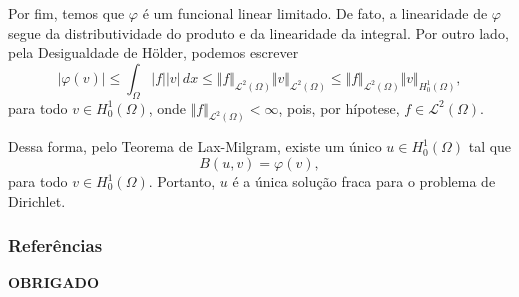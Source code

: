 \documentclass[xcolor=dvipsnames, aspectratio=169, 10pt]{beamer}
\newcommand{\cL}{\mathcal{L}}
\begin{document}
\begin{frame}
    Por fim, temos que $\varphi$ é um funcional linear limitado.
De fato, a linearidade de $\varphi$ segue da distributividade do produto e da linearidade da integral.
Por outro lado, pela Desigualdade de Hölder, podemos escrever
\[
    |\varphi(v)| \leqslant \int_\Omega |f| |v| \,dx \leqslant \Vert f \Vert_{\cL^2(\Omega)} \Vert v \Vert_{\cL^2(\Omega)} \leqslant \Vert f \Vert_{\cL^2(\Omega)} \Vert v \Vert_{H^1_0(\Omega)},
\]
para todo $v \in H^1_0(\Omega)$, onde $\Vert f \Vert_{\cL^2(\Omega)} < \infty$, pois, por hípotese, $f \in \cL^2(\Omega)$.
\end{frame}
\begin{frame}
    Dessa forma, pelo Teorema de Lax-Milgram, existe um único $u \in H^1_0(\Omega)$ tal que
\[
    B(u,v) = \varphi(v),
\]
para todo $v \in H^1_0(\Omega)$.
Portanto, $u$ é a única solução fraca para o problema de Dirichlet.
\end{frame}
\begin{frame}
    \frametitle{Referências}
    \nocite{evans-pde,zingano-edp,kreyszig-functional.analysis,brezis-functional.analysis,folland-real.analysis,leray-fluid,bartle-measure.theory}
    \printbibliography
\end{frame}
\begin{frame}
    \begin{center}
        \huge\bfseries OBRIGADO
    \end{center}
\end{frame}
\end{document}
